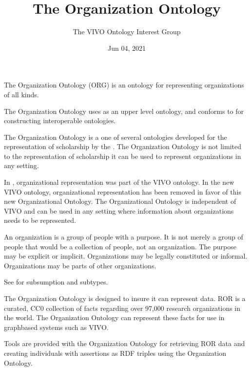\documentclass[letterpaper,10pt,english]{sphinxmanual}
\title{The Organization Ontology}
\date{Jun 04, 2021}
\author{The VIVO Ontology Interest Group}
\begin{document}
\pagestyle{empty}
\sphinxmaketitle
\pagestyle{plain}
\sphinxtableofcontents
\pagestyle{normal}
\label{\detokenize{index::doc}}


\sphinxAtStartPar
The Organization Ontology (ORG) is an ontology for
representing organizations of all kinds.

\sphinxAtStartPar
The Organization Ontology uses  as an upper level ontology, and conforms to
 for constructing interoperable ontologies.

\sphinxAtStartPar
The Organization
Ontology is a one of several ontologies developed for the representation of
scholarship by the . The Organization Ontology is
not limited to the representation of
scholarship \textendash{} it can be used to represent organizations in any setting.

\sphinxAtStartPar
In {\hyperref[\detokenize{glossary:glossary}]{}}, organizational representation was part of the VIVO
ontology.  In the new VIVO ontology, organizational
representation has been removed in favor of this new Organizational Ontology.  The
Organizational Ontology
is independent of VIVO and
can be used in any setting where information about organizations needs to be
represented.

\sphinxAtStartPar
An organization is a group of people with a purpose. It is not merely a group of
people \textendash{} that would be a collection of people, not an organization. The purpose
may be explicit or implicit. Organizations may be legally constituted or informal.
Organizations may be parts of other organizations.

\sphinxAtStartPar
See {\hyperref[\detokenize{organizations:organizations}]{}} for subsumption and subtypes.

\sphinxAtStartPar
The Organization Ontology is designed to insure it can represent
 data. ROR is a curated, CC0
collection of facts regarding over 97,000 research organizations in the world. The
Organization Ontology can represent these facts for use in graph\sphinxhyphen{}based systems such
as VIVO.

\sphinxAtStartPar
Tools are provided with the Organization Ontology for retrieving ROR data and
creating individuals with assertions as RDF triples using the Organization Ontology.
\end{document}
